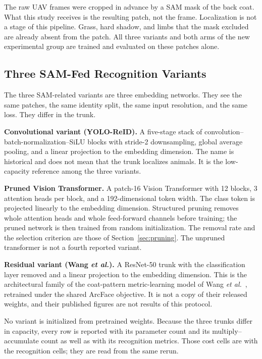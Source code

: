 The raw UAV frames were cropped in advance by a SAM mask of the back coat. What this study receives is the resulting patch, not the frame. Localization is not a stage of this pipeline. Grass, hard shadow, and limbs that the mask excluded are already absent from the patch. All three variants and both arms of the new experimental group are trained and evaluated on these patches alone.

\subsection{Three SAM-Fed Recognition Variants}
\label{sec:branches}

The three SAM-related variants are three embedding networks. They see the same patches, the same identity split, the same input resolution, and the same loss. They differ in the trunk.

\textbf{Convolutional variant (YOLO-ReID).}
A five-stage stack of convolution--batch-normalization--SiLU blocks with stride-2 downsampling, global average pooling, and a linear projection to the embedding dimension. The name is historical and does not mean that the trunk localizes animals. It is the low-capacity reference among the three variants.

\textbf{Pruned Vision Transformer.}
A patch-16 Vision Transformer with 12 blocks, 3 attention heads per block, and a 192-dimensional token width. The class token is projected linearly to the embedding dimension. Structured pruning removes whole attention heads and whole feed-forward channels before training; the pruned network is then trained from random initialization. The removal rate and the selection criterion are those of Section~\ref{sec:pruning}. The unpruned transformer is not a fourth reported variant.

\textbf{Residual variant (Wang \emph{et al.}).}
A ResNet-50 trunk with the classification layer removed and a linear projection to the embedding dimension. This is the architectural family of the coat-pattern metric-learning model of Wang \emph{et al.}~\cite{wang2025coatdml}, retrained under the shared ArcFace objective. It is not a copy of their released weights, and their published figures are not results of this protocol.

No variant is initialized from pretrained weights. Because the three trunks differ in capacity, every row is reported with its parameter count and its multiply--accumulate count as well as with its recognition metrics. Those cost cells are \pending{} with the recognition cells; they are read from the same rerun.

